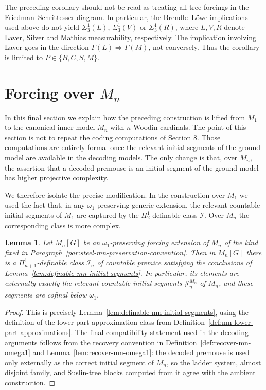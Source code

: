 \documentclass[a4paper,11pt]{article}
\newtheorem{lemma}[theorem]{Lemma}
\begin{document}
The preceding corollary should not be read as treating all tree forcings in
the Friedman--Schrittesser diagram. In particular, the Brendle--L\"owe
implications used above do not yield $\Sigma^1_3(L)$, $\Sigma^1_3(V)$ or
$\Sigma^1_3(R)$, where $L,V,R$ denote Laver, Silver and Mathias measurability,
respectively. The implication involving Laver goes in the direction
$\Gamma(L)\Rightarrow\Gamma(M)$, not conversely. Thus the corollary is limited
to $P\in\{B,C,S,M\}$.


\section{Forcing over $M_n$}

In this final section we explain how the preceding construction is lifted
from $M_1$ to the canonical inner model $M_n$ with $n$ Woodin cardinals.
The point of this section is not to repeat the coding computations of
Section 8. Those computations are entirely formal once the relevant
initial segments of the ground model are available in the decoding models.
The only change is that, over $M_n$, the assertion that a decoded premouse is
an initial segment of the ground model has higher projective complexity.

We therefore isolate the precise modification. In the construction over
$M_1$ we used the fact that, in any $\omega_1$-preserving generic extension,
the relevant countable initial segments of $M_1$ are captured by the
$\Pi^1_2$-definable class $\mathcal I$. Over $M_n$ the corresponding class is
more complex.


\begin{lemma}\label{Mn-initial-segments}
Let $M_n[G]$ be an $\omega_1$-preserving forcing extension of $M_n$ of the kind fixed in Paragraph~\ref{par:steel-mn-preservation-convention}. Then in $M_n[G]$ there is a $\Pi^1_{n+1}$-definable class $\mathcal I_n$ of countable premice satisfying the conclusions of Lemma~\ref{lem:definable-mn-initial-segments}. In particular, its elements are externally exactly the relevant countable initial segments $\mathcal J^{M_n}_\eta$ of $M_n$, and these segments are cofinal below $\omega_1$.
\end{lemma}

\begin{proof}
This is precisely Lemma~\ref{lem:definable-mn-initial-segments}, using the definition of the lower-part approximation class from Definition~\ref{def:mn-lower-part-approximations}. The final compatibility statement used in the decoding arguments follows from the recovery convention in Definition~\ref{def:recover-mn-omega1} and Lemma~\ref{lem:recover-mn-omega1}: the decoded premouse is used only externally as the correct initial segment of $M_n$, so the ladder system, almost disjoint family, and Suslin-tree blocks computed from it agree with the ambient construction.
\end{proof}
\end{document}
